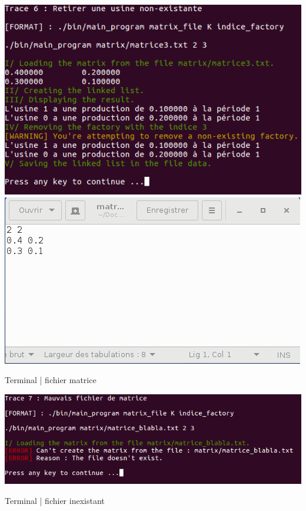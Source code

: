 \documentclass[a4paper]{article}
\begin{document}
\begin{center}
\includegraphics[scale=0.4]{trace_7.png}
\includegraphics[scale=0.4]{matrice_2.png}

Terminal | fichier matrice
\end{center}

\begin{center}
\includegraphics[scale=0.4]{trace_8.png}

Terminal | fichier inexistant
\end{center}
\end{document}
